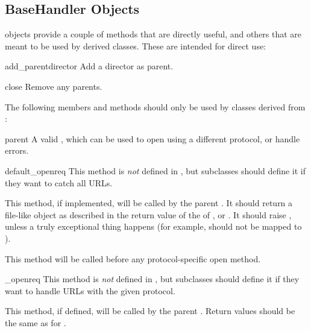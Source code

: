 \subsection{BaseHandler Objects \label{base-handler-objects}}

 objects provide a couple of methods that are
directly useful, and others that are meant to be used by derived
classes.  These are intended for direct use:

\begin{methoddesc}[BaseHandler]{add_parent}{director}
Add a director as parent.
\end{methoddesc}

\begin{methoddesc}[BaseHandler]{close}{}
Remove any parents.
\end{methoddesc}

The following members and methods should only be used by classes
derived from :

\begin{memberdesc}[BaseHandler]{parent}
A valid , which can be used to open using a
different protocol, or handle errors.
\end{memberdesc}

\begin{methoddesc}[BaseHandler]{default_open}{req}
This method is \emph{not} defined in , but
subclasses should define it if they want to catch all URLs.

This method, if implemented, will be called by the parent
.  It should return a file-like object as
described in the return value of the  of
, or .  It should raise
, unless a truly exceptional thing happens (for
example,  should not be mapped to
).

This method will be called before any protocol-specific open method.
\end{methoddesc}

\begin{methoddescni}[BaseHandler]{_open}{req}
This method is \emph{not} defined in , but
subclasses should define it if they want to handle URLs with the given
protocol.

This method, if defined, will be called by the parent
.  Return values should be the same as for 
.
\end{methoddescni}

